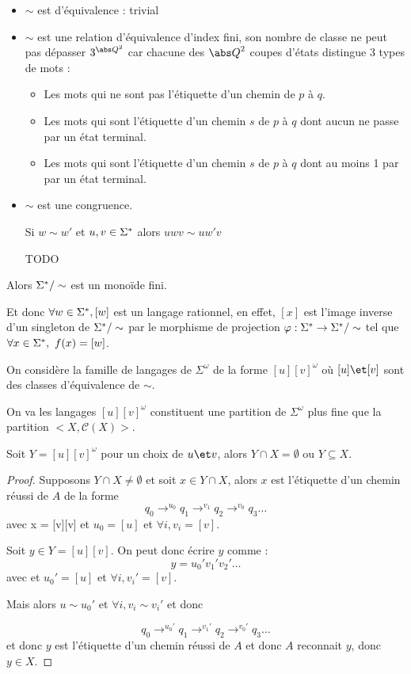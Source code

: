 \begin{itemize}
	\item $\sim$ est d'équivalence : trivial
	\item $\sim$ est une relation d'équivalence d'index fini, son nombre de classe ne peut pas dépasser $3^{{\abs Q}^2}$
	      car chacune des ${\abs Q}^2$ coupes d'états distingue 3 types de mots :
	      \begin{itemize}
		      \item Les mots qui ne sont pas l'étiquette d'un chemin de $p$ à $q$.
		      \item Les mots qui sont l'étiquette d'un chemin $s$ de $p$ à $q$ dont aucun ne passe par un état terminal.
		      \item Les mots qui sont l'étiquette d'un chemin $s$ de $p$ à $q$ dont au moins 1 par par un état terminal.
	      \end{itemize}
	\item $\sim$ est une congruence.

	      Si $w \sim w'$ et $u,v \in \Sigma^{*}$ alors $uwv \sim uw'v$

	      TODO
\end{itemize}

Alors $\Sigma^{*} / \sim$ est un monoïde fini.

Et donc $\forall w \in \Sigma^{*}, [w]$ est un langage rationnel, en effet, $[x]$ est l'image inverse d'un singleton de $\Sigma^{*} / \sim$
par le morphisme de projection $\varphi : \Sigma^{*} \to \Sigma^{*} / \sim$ tel que $\forall x \in \Sigma^{*},\ f (x) = [w] $.


On considère la famille de langages de $\Sigma^{\omega}$ de la forme $[u][v]^{\omega}$ où $[u] \et [v]$ sont des classes d'équivalence de $\sim$.

On va \mq les langages $[u][v]^{\omega}$ constituent une partition de $\Sigma^{\omega}$ plus fine que la partition $<X,\mathcal{C}(X)>$.



\begin{prop}\label{prop:buchi1}
	Soit $Y = [u][v]^{\omega}$ pour un choix de $u \et v$, alors $Y \cap X = \emptyset$ ou $Y \subseteq X$.
\end{prop}


\begin{proof}
	Supposons $Y \cap X \neq \emptyset$ et soit $x \in Y \cap X$, alors $x$ est l'étiquette d'un chemin réussi de $A$
	de la forme
	$$q_0 \to^{u_0} q_1 \to^{v_1} q_2 \to^{v_0} q_3 \ldots$$
	avec x = [v][v] et $u_0 = [u]$ et $\forall i, v_i = [v]$.

	Soit $y \in Y = [u][v]$. On peut donc écrire $y$ comme :
	$$ y = u_0'v_1'v_2'\ldots$$
	avec et $u_0' = [u]$ et $\forall i, v_i' = [v]$.

	Mais alors $u \sim u_0'$ et $\forall i, v_i \sim v_i'$ et donc

	$$q_0 \to^{u_0'} q_1 \to^{v_1'} q_2 \to^{v_0'} q_3 \ldots$$
	et donc $y$ est l'étiquette d'un chemin réussi de $A$ et donc $A$ reconnait $y$, donc $y \in X$.
\end{proof}



